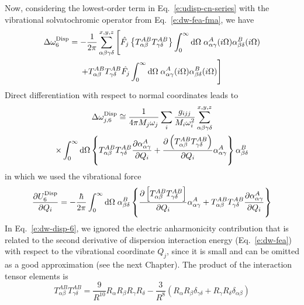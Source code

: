 \documentclass[b5paper,oneside,fleqn,11pt]{book}
\newcommand{\fderiv}[2]{\ensuremath{
    \frac{\partial #1}{\partial #2}}}
\begin{document}
\begin{refsection}
Now, considering the lowest\hyp{}order term in Eq.~\eqref{e:udisp-cn-series} 
with the vibrational solvatochromic operator from Eq.~\eqref{e:dw-fea-fma}, we have
%
\begin{multline}
   \Delta\omega^{\rm Disp}_6 = - \frac{1}{2\pi} \sum_{\alpha\beta\gamma\delta}^{x,y,z} 
   \Bigg[ 
   \hat{F_j} \left\{ T^{AB}_{\alpha\beta}T^{AB}_{\gamma\delta} \right\} \int_0^{\infty} {\rm d}\Omega \; 
    \alpha^A_{\alpha\gamma}(i\Omega)\alpha^B_{\beta\delta}(i\Omega) \\
   + 
   T^{AB}_{\alpha\beta}T^{AB}_{\gamma\delta} \hat{F_j} \int_0^{\infty} {\rm d}\Omega \;
   \alpha^A_{\alpha\gamma}(i\Omega)\alpha^B_{\beta\delta}(i\Omega) 
   \Bigg]
\end{multline}
%
Direct differentiation with respect to normal coordinates leads to 
%
\begin{multline} \label{e:dw-disp-6}
 \Delta\omega_{j,6}^{\rm Disp} \cong 
\frac{1}{4\pi M_j\omega_j}\sum_i \frac{g_{ijj}}{M_i\omega_i^2} 
\sum_{\alpha\beta\gamma\delta}^{x,y,z} \\  \times \int_{0}^{\infty} {\rm d}\Omega
%
 \left\{
T^{AB}_{\alpha\beta}T^{AB}_{\gamma\delta}
\frac{\partial \alpha_{\alpha\gamma}^{A}}{\partial Q_i}
+
\frac{\partial \left(T^{AB}_{\alpha\beta}T^{AB}_{\gamma\delta}\right)}{\partial Q_i}
\alpha_{\alpha\gamma}^{A}
\right\}
\alpha_{\beta\delta}^{B}
\end{multline}
%
in which we used the vibrational force 
%
\begin{equation} \label{e:vibr-force-disp-6}
 \fderiv{U^{\rm Disp}_6}{Q_i} = -\frac{\hbar}{2\pi} \int_0^\infty {\rm d}\Omega \;
 \alpha^B_{\beta\delta}
 \left\{
     \fderiv{\left[T^{AB}_{\alpha\beta}T^{AB}_{\gamma\delta}\right]}{Q_i} 
         \alpha^A_{\alpha\gamma}
      + 
     T^{AB}_{\alpha\beta}T^{AB}_{\gamma\delta} \fderiv{\alpha^A_{\alpha\gamma}}{Q_i}
 \right\}
\end{equation}
%
In Eq.~\eqref{e:dw-disp-6}, we ignored the electric anharmonicity contribution 
that is related to the second derivative of dispersion interaction energy 
(Eq.~\eqref{e:dw-fea}) with respect to the vibrational coordinate $Q_j$, 
since it is small and can be omitted as a good approximation 
(see the next Chapter). 
The product of the interaction tensor elements is
%
\begin{equation} \label{e:378463267}
 T^{AB}_{\alpha\beta} T^{AB}_{\gamma\delta} = \frac{9}{R^{10}} R_\alpha R_\beta R_\gamma R_\delta
 - \frac{3}{R^8} \left( R_\alpha R_\beta \delta_{\gamma\delta} + R_\gamma R_\delta \delta_{\alpha\beta}\right)

\end{equation}
\end{refsection}
\end{document}
